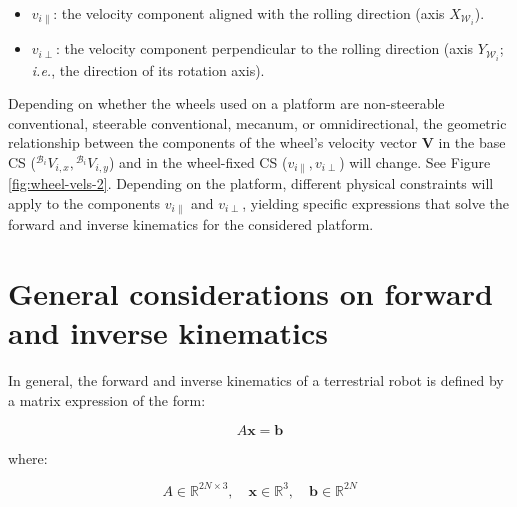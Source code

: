 \documentclass[11pt,a4paper]{article}
\newcommand{\vect}[1]{\bm{#1}}       %
\newcommand{\frameBi}{\mathcal{B}_i}
\newcommand{\frameWi}{\mathcal{W}_i}
\newcommand{\ejeXWi}{X_{\frameWi}}
\newcommand{\ejeYWi}{Y_{\frameWi}}
\begin{document}
\begin{itemize}
    \item \(v_{i\parallel}\): the velocity component aligned with the rolling direction (axis \(\ejeXWi\)).
    \item \(v_{i\perp}\): the velocity component perpendicular to the rolling direction (axis \(\ejeYWi\); \textit{i.e.}, the direction of its rotation axis).
\end{itemize}

Depending on whether the wheels used on a platform are non-steerable conventional, steerable conventional, mecanum, or omnidirectional, the geometric relationship between the components of the wheel's velocity vector \(\vect{V}\) in the base CS (\({}^{\frameBi}V_{i,x}, {}^{\frameBi}V_{i,y}\)) and in the wheel-fixed CS (\(v_{i\parallel}, v_{i\perp}\)) will change. See Figure \ref{fig:wheel-vels-2}. Depending on the platform, different physical constraints will apply to the components \(v_{i\parallel}\) and \(v_{i\perp}\), yielding specific expressions that solve the forward and inverse kinematics for the considered platform.

\section{General considerations on forward and inverse kinematics}
\label{sec:general-considerations}

In general, the forward and inverse kinematics of a terrestrial robot is defined by a matrix expression of the form:

\begin{equation}
    A\mathbf{x}=\mathbf{b}
\end{equation}

where:

\[
    A \in \mathbb{R}^{2N \times 3}, \quad \mathbf{x} \in \mathbb{R}^3, \quad \mathbf{b} \in \mathbb{R}^{2N}
\]
\end{document}
